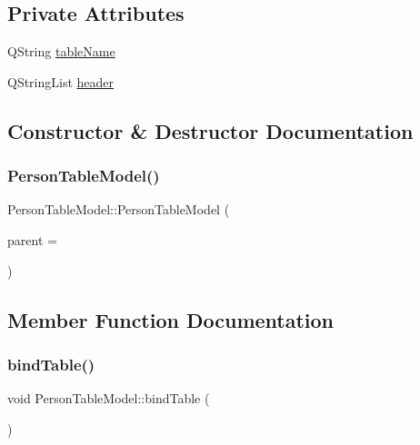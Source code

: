 \subsection*{Private Attributes}
\begin{DoxyCompactItemize}
\item 
Q\+String \mbox{\hyperlink{class_person_table_model_aa9eec9359f87a39d2234dcaa324287d3}{table\+Name}}
\item 
Q\+String\+List \mbox{\hyperlink{class_person_table_model_a09a55d4ee08db1303be39589899a8081}{header}}
\end{DoxyCompactItemize}


\subsection{Constructor \& Destructor Documentation}
\mbox{\label{class_person_table_model_af1b578edb6207eeb621e50fa2d246fb6}} 
\subsubsection{\texorpdfstring{PersonTableModel()}{PersonTableModel()}}
{\footnotesize\ttfamily Person\+Table\+Model\+::\+Person\+Table\+Model (\begin{DoxyParamCaption}\item[{Q\+Object $\ast$}]{parent = {} }\end{DoxyParamCaption})\hspace{0.3cm}{\ttfamily [explicit]}}



\subsection{Member Function Documentation}
\mbox{\label{class_person_table_model_a4abbde77bb6256c11d464d59c77878e4}} 
\subsubsection{\texorpdfstring{bindTable()}{bindTable()}}
{\footnotesize\ttfamily void Person\+Table\+Model\+::bind\+Table (\begin{DoxyParamCaption}\item[{void}]{ }\end{DoxyParamCaption})}



